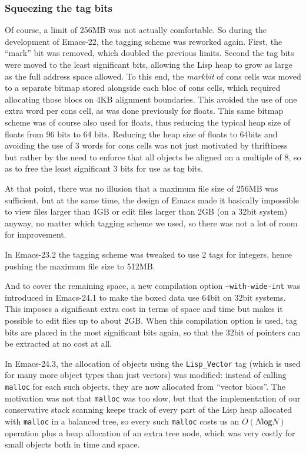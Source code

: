 \documentclass[format=acmsmall, review=false, screen=true]{acmart}
\begin{document}
\subsubsection{Squeezing the tag bits}
Of course, a limit of 256MB was not actually comfortable.  So during the
development of Emacs-22, the tagging scheme was reworked again.
First, the ``mark'' bit was removed, which doubled the previous limits.
Second the tag bits were moved to the least significant bits, allowing
the Lisp heap to grow as large as the full address space allowed.
To this end, the \emph{markbit} of cons cells was moved to a separate bitmap
stored alongside each bloc of cons cells, which required allocating those
blocs on 4KB alignment boundaries.  This avoided the use of one extra word
per cons cell, as was done previously for floats.  This same bitmap scheme
was of course also used for floats, thus reducing the typical heap size of
floats from 96 bits to 64 bits.  Reducing the heap size of floats to 64bits
and avoiding the use of 3 words for cons cells was not just motivated by
thriftiness but rather by the need to enforce that all objects be aligned on
a multiple of 8, so as to free the least significant 3 bits for use as
tag bits.

At that point, there was no illusion that a maximum file size of 256MB was
sufficient, but at the same time, the design of Emacs made it basically
impossible to view files larger than 4GB or edit files larger than 2GB (on
a 32bit system) anyway, no matter which tagging scheme we used, so there was
not a lot of room for improvement.

In Emacs-23.2 the tagging scheme was tweaked to use 2 tags for integers,
hence pushing the maximum file size to 512MB.

And to cover the remaining space, a new compilation option
\texttt{--with-wide-int} was introduced in Emacs-24.1 to make the boxed data
use 64bit on 32bit systems.  This imposes a significant extra cost in terms
of space and time but makes it possible to edit files up to about 2GB.
When this compilation option is used, tag bits are placed in the most
significant bits again, so that the 32bit of pointers can be extracted at no
cost at all.

In Emacs-24.3, the allocation of objects using the \texttt{Lisp\_Vector} tag
(which is used for many more object types than just vectors) was modified:
instead of calling \texttt{malloc} for each such objects, they are now
allocated from ``vector blocs''.  The motivation was not that
\texttt{malloc} was too slow, but that the implementation of our
conservative stack scanning keeps track of every part of the Lisp heap
allocated with \texttt{malloc} in a balanced tree, so every such
\texttt{malloc} costs us an $O(N \textsf{log} N)$ operation plus a heap
allocation of an extra tree node, which was very costly for small objects
both in time and space.
\end{document}
